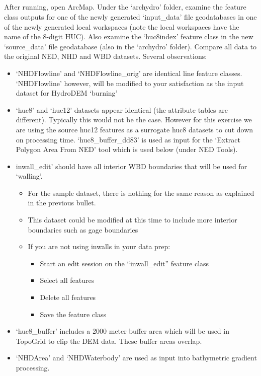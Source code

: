 \documentclass[letterpaper,10pt,english]{sphinxmanual}
\begin{document}
\subparagraph{}
\label{\detokenize{ex_1:step-1b-examine-the-outputs}}
After running, open ArcMap.  Under the ‘archydro’ folder, examine the feature class outputs for one of the newly generated ‘input\_data’ file geodatabases in one of the newly generated local workspaces (note the local workspaces have the name of the 8-digit HUC).  Also examine the ‘huc8index’ feature class in the new ‘source\_data’ file geodatabase (also in the ‘archydro’ folder).  Compare all data to the original NED, NHD and WBD datasets.  Several observations:
\begin{itemize}
\item {} 
‘NHDFlowline’ and ‘NHDFlowline\_orig’ are identical line feature classes. ‘NHDFlowline’ however, will be modified to your satisfaction as the input dataset for HydroDEM ‘burning’

\item {} 
‘huc8’ and ‘huc12’ datasets appear identical (the attribute tables are different).  Typically this would not be the case.  However for this exercise we are using the source huc12 features as a surrogate huc8 datasets to cut down on processing time. ‘huc8\_buffer\_dd83’ is used as input for the ‘Extract Polygon Area From NED’ tool which is used below (under NED Tools).

\item {} 
inwall\_edit’ should have all interior WBD boundaries that will be used for ‘walling’.
\begin{itemize}
\item {} 
For the sample dataset, there is nothing for the same reason as explained in the previous bullet.

\item {} 
This dataset could be modified at this time to include more interior boundaries such as gage boundaries

\item {} 
If you are not using inwalls in your data prep:
\begin{itemize}
\item {} 
Start an edit session on the “inwall\_edit” feature class

\item {} 
Select all features

\item {} 
Delete all features

\item {} 
Save the feature class

\end{itemize}

\end{itemize}

\item {} 
‘huc8\_buffer’ includes a 2000 meter buffer area which will be used in TopoGrid to clip the DEM data.  These buffer areas overlap.

\item {} 
‘NHDArea’ and ‘NHDWaterbody’ are used as input into bathymetric gradient processing.

\end{itemize}
\end{document}
